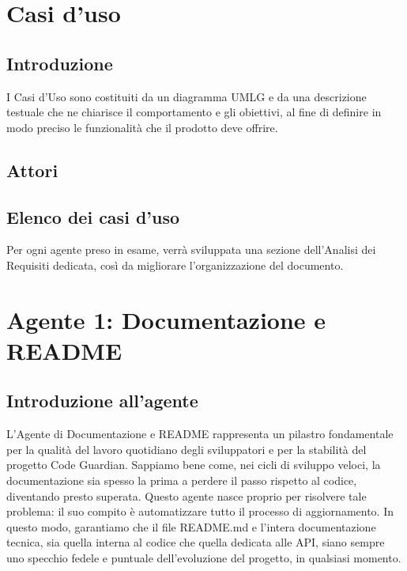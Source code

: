 \documentclass[12pt, a4paper]{article}
\begin{document}
\section{Casi d'uso}\label{casi-duso}


\subsection{Introduzione}\label{introduzione-1}
I Casi d’Uso sono costituiti da un diagramma UMLG e da una descrizione testuale che ne
chiarisce il comportamento e gli obiettivi, al fine di definire in modo preciso le funzionalità che
il prodotto deve offrire.

\subsection{Attori}\label{attori}

\subsection{Elenco dei casi d'uso}\label{elenco-dei-casi-duso}
Per ogni agente preso in esame, verrà sviluppata una sezione dell'Analisi dei Requisiti dedicata, così da migliorare l'organizzazione del documento.


\section{Agente 1: Documentazione e README}



\subsection{Introduzione all'agente}

L'Agente di Documentazione e README rappresenta un pilastro fondamentale per la qualità del lavoro quotidiano degli sviluppatori e per la stabilità del progetto Code Guardian. Sappiamo bene come, nei cicli di sviluppo veloci, la documentazione sia spesso la prima a perdere il passo rispetto al codice, diventando presto superata. Questo agente nasce proprio per risolvere tale problema: il suo compito è automatizzare tutto il processo di aggiornamento. In questo modo, garantiamo che il file README.md e l'intera documentazione tecnica, sia quella interna al codice che quella dedicata alle API, siano sempre uno specchio fedele e puntuale dell'evoluzione del progetto, in qualsiasi momento.
\end{document}
